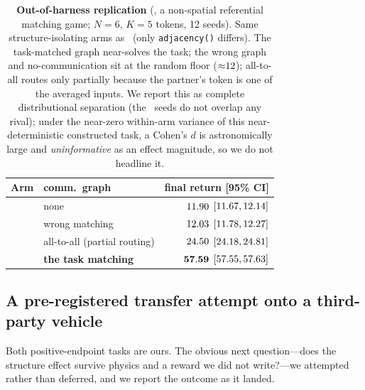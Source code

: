 \begin{table}[t]
  \centering
  \footnotesize
  \caption{\textbf{Out-of-harness replication} (\tokenmatch, a non-spatial
  referential matching game; $N{=}6$, $K{=}5$ tokens, 12 seeds). Same
  structure-isolating arms as \pairrouting\ (only \texttt{adjacency()}
  differs). The task-matched graph near-solves the task; the wrong graph and
  no-communication sit at the random floor (${\approx}12$); all-to-all
  routes only partially because the partner's token is one of the averaged
  inputs. We report this as complete distributional separation (the \gtrue\
  seeds do not overlap any rival); under the near-zero within-arm variance of
  this near-deterministic constructed task, a Cohen's $d$ is astronomically
  large and \emph{uninformative} as an effect magnitude, so we do not headline
  it.}
  \label{tab:tokenmatch}
  \begin{tabular}{llr}
    \toprule
    Arm & comm.\ graph & final return [95\% CI] \\
    \midrule
    \mlpc      & none                  & $11.90$ $[11.67, 12.14]$ \\
    \gwrong    & wrong matching        & $12.03$ $[11.78, 12.27]$ \\
    \gcomplete & all-to-all (partial routing) & $24.50$ $[24.18, 24.81]$ \\
    \textbf{\gtrue} & \textbf{the task matching} & $\mathbf{57.59}$ $[57.55, 57.63]$ \\
    \bottomrule
  \end{tabular}
\end{table}

\subsection{A pre-registered transfer attempt onto a third-party vehicle}
\label{sec:structure:transfer}

Both positive-endpoint tasks are ours. The obvious next question---does the
structure effect survive physics and a reward we did not write?---we attempted
rather than deferred, and we report the outcome as it landed.

